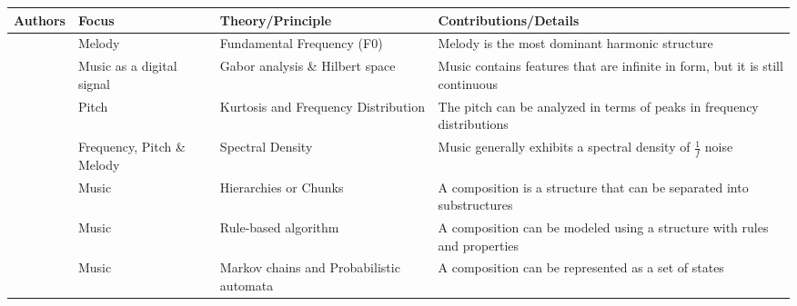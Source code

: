 \begin{landscape} %
\begin{table} [!htbp]  

         \label{tab:rsotmaomaim} 
   \vspace{0.20cm}    
        \begin{tabular}{|p{5cm}|p{5cm}|p{5cm}|p{5cm}|} %
        \hline 

       Authors & Focus & Theory/Principle & Contributions/Details \\ \hline
       
       \citet{goto2004real, salamon2012melody, poliner2007melody} & Melody & Fundamental Frequency (F0) & Melody is the most dominant harmonic structure \\ \hline
       
       \citet{dorfler2001time} & Music as a digital signal & Gabor analysis \& Hilbert space & Music contains features that are infinite in form, but it is still continuous \\ \hline
       
       \citet{fucks1962mathematical} & Pitch & Kurtosis and Frequency Distribution & The pitch can be analyzed in terms of peaks in frequency distributions \\ \hline
       
       \citet{voss1978noise, nettheim1992on, gunduz2005mathematical} & Frequency, Pitch \& Melody & Spectral Density & Music generally exhibits a spectral density of $\frac{1}{f}$ noise \\ \hline
       
       \citet{buxton1978the, brinkman1984data} & Music & Hierarchies or Chunks & A composition is a structure that can be separated into substructures \\ \hline
       
       \citet{bozhanov2014computoser} & Music & Rule-based algorithm & A composition can be modeled using a structure with rules and properties \\ \hline
       
       \citet{schulze2011music} & Music & Markov chains and Probabilistic automata & A composition can be represented as a set of states \\ \hline
       
        \end{tabular}
\end{table}
\end{landscape}


